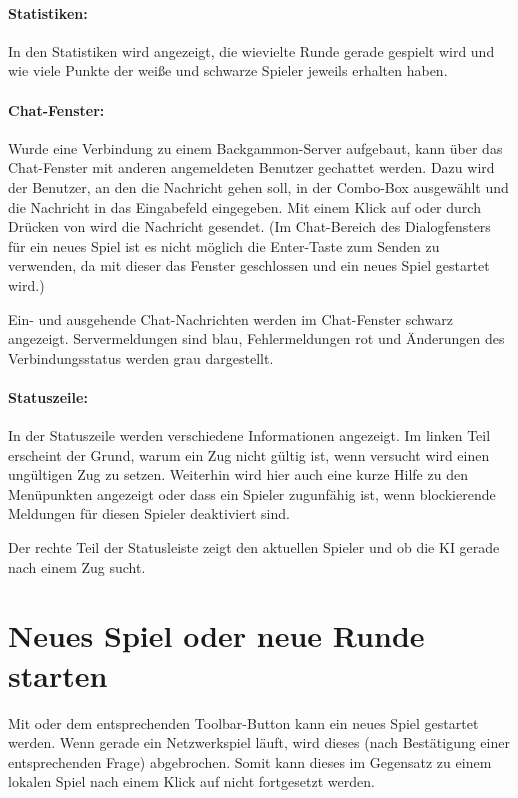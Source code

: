 \paragraph*{Statistiken:} In den Statistiken wird angezeigt, die wievielte Runde gerade gespielt wird und wie viele Punkte der weiße und schwarze Spieler jeweils erhalten haben.

\paragraph*{Chat-Fenster:} Wurde eine Verbindung zu einem Backgammon-Server aufgebaut, kann über das Chat-Fenster mit anderen angemeldeten Benutzer gechattet werden. Dazu wird der Benutzer, an den die Nachricht gehen soll, in der Combo-Box ausgewählt und die Nachricht in das Eingabefeld eingegeben. Mit einem Klick auf  oder durch Drücken von  wird die Nachricht gesendet. (Im Chat-Bereich des Dialogfensters für ein neues Spiel ist es nicht möglich die Enter-Taste zum Senden zu verwenden, da mit dieser das Fenster geschlossen und ein neues Spiel gestartet wird.)

Ein- und ausgehende Chat-Nachrichten werden im Chat-Fenster schwarz angezeigt. Servermeldungen sind blau, Fehlermeldungen rot und Änderungen des Verbindungsstatus werden grau dargestellt.

\paragraph*{Statuszeile:} In der Statuszeile werden verschiedene Informationen angezeigt. Im linken Teil erscheint der Grund, warum ein Zug nicht gültig ist, wenn versucht wird einen ungültigen Zug zu setzen. Weiterhin wird hier auch eine kurze Hilfe zu den Menüpunkten angezeigt oder dass ein Spieler zugunfähig ist, wenn blockierende Meldungen für diesen Spieler deaktiviert sind.

Der rechte Teil der Statusleiste zeigt den aktuellen Spieler und ob die KI gerade nach einem Zug sucht.

\section{Neues Spiel oder neue Runde starten}
Mit  oder dem entsprechenden Toolbar-Button kann ein neues Spiel gestartet werden. Wenn gerade ein Netzwerkspiel läuft, wird dieses (nach Bestätigung einer entsprechenden Frage) abgebrochen. Somit kann dieses im Gegensatz zu einem lokalen Spiel nach einem Klick auf  nicht fortgesetzt werden.

